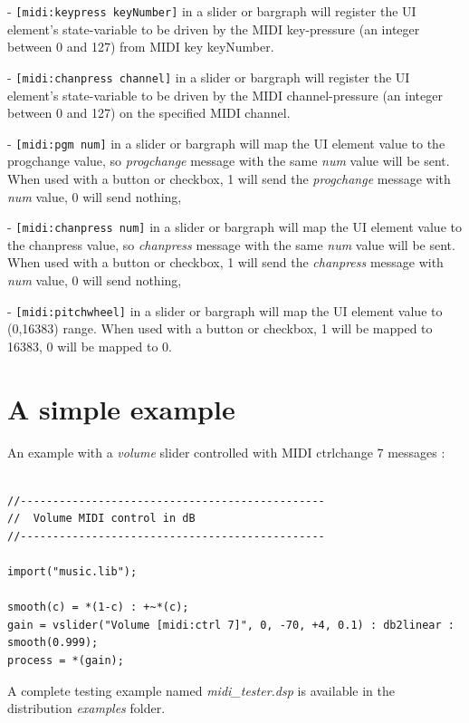 - \lstinline'[midi:keypress keyNumber]' in a slider or bargraph will
register the UI element's state-variable to be driven by the MIDI
key-pressure (an integer between 0 and 127) from MIDI key keyNumber.

- \lstinline'[midi:chanpress channel]' in a slider or bargraph will
register the UI element's state-variable to be driven by the MIDI
channel-pressure (an integer between 0 and 127) on the specified MIDI
channel.

- \lstinline'[midi:pgm num]' in a slider or bargraph will map the UI element value to the progchange value, so \emph{progchange} message with the same \emph{num} value will be sent. When used with a button or checkbox, 1 will send the \emph{progchange} message with \emph{num} value, 0 will send nothing,

- \lstinline'[midi:chanpress num]' in a slider or bargraph will map the UI element value to the chanpress value, so \emph{chanpress} message with the same \emph{num} value will be sent. When used with a button or checkbox, 1 will send the \emph{chanpress} message with \emph{num} value, 0 will send nothing,

- \lstinline'[midi:pitchwheel]' in a slider or bargraph will map the UI element value to (0,16383) range. When used with a button or checkbox, 1 will be mapped to 16383, 0 will be mapped to 0.

\section{A simple example}

An example with a \emph{volume} slider controlled with MIDI ctrlchange 7 messages :

\begin{lstlisting}

//-----------------------------------------------
//  Volume MIDI control in dB
//-----------------------------------------------

import("music.lib");

smooth(c) = *(1-c) : +~*(c);
gain = vslider("Volume [midi:ctrl 7]", 0, -70, +4, 0.1) : db2linear : smooth(0.999);
process = *(gain);

\end{lstlisting}

A complete testing example named  \emph{midi\_tester.dsp}  is available in the \faust distribution \emph{examples} folder.

